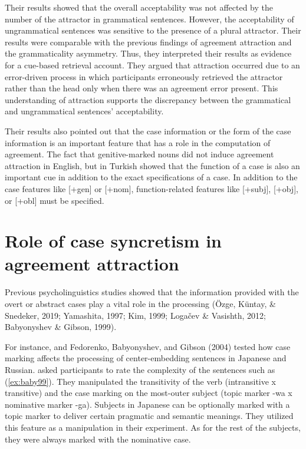 Their results showed that the overall acceptability was not affected by the number of the attractor in grammatical sentences. However, the acceptability of ungrammatical sentences was sensitive to the presence of a plural attractor. Their results were comparable with the previous findings of agreement attraction and the grammaticality asymmetry. Thus, they interpreted their results as evidence for a cue-based retrieval account. They argued that attraction occurred due to an error-driven process in which participants erroneously retrieved the attractor rather than the head only when there was an agreement error present. This understanding of attraction supports the discrepancy between the grammatical and ungrammatical sentences' acceptability.

Their results also pointed out that the case information or the form of the case information is an important feature that has a role in the computation of agreement. The fact that genitive-marked nouns did not induce agreement attraction in English, but in Turkish showed that the function of a case is also an important cue in addition to the exact specifications of a case. In addition to the case features like [+{gen}] or [+{nom}], function-related features like [+{subj}], [+{obj}], or [+{obl}] must be specified. 



\section{Role of case syncretism in agreement attraction} \label{sec:sync}

Previous psycholinguistics studies showed that the information provided with the overt or abstract cases play a vital role in the processing (\"Ozge, K\"untay, \& Snedeker, 2019; Yamashita, 1997; Kim, 1999; Loga\v{c}ev \& Vasishth, 2012; Babyonyshev \& Gibson, 1999). 

For instance,  and Fedorenko, Babyonyshev, and Gibson (2004) tested how case marking affects the processing of center-embedding sentences in Japanese and Russian.  asked participants to rate the complexity of the sentences such as (\ref{ex:baby99}). They manipulated the transitivity of the verb (intransitive x transitive) and the case marking on the most-outer subject (topic marker -wa x nominative marker -ga). Subjects in Japanese can be optionally marked with a topic marker to deliver certain pragmatic and semantic meanings. They utilized this feature as a manipulation in their experiment. As for the rest of the subjects, they were always marked with the nominative case. 

